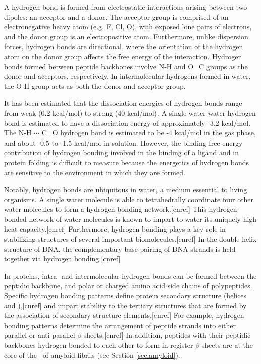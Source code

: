 A hydrogen bond is formed from electrostatic interactions arising between two dipoles: an acceptor and a donor.   The acceptor group is comprised of an electronegative heavy atom (e.g. F, Cl, O), with exposed lone pairs of electrons, and the donor group is an electropositive atom.  Furthermore, unlike dispersion forces, hydrogen bonds are directional, where the orientation of the hydrogen atom on the donor group affects the free energy of the interaction. Hydrogen bonds formed between peptide backbones involve N-H and O=C groups as the donor and acceptors, respectively.  In intermolecular hydrogens formed in water, the O-H group acts as both the donor and acceptor group.

It has been estimated that the dissociation energies of hydrogen bonds range from weak (0.2 kcal/mol) to strong (40 kcal/mol).\cite{Steiner:2002tb} A single water-water hydrogen bond is estimated to have a dissociation energy of approximately -3.2 kcal/mol.\cite{Steiner:2002tb}  The N-H $\cdots$ C=O hydrogen bond is estimated to be -4 kcal/mol in the gas phase,\cite{Klotz:1993fk} and about -0.5 to -1.5 kcal/mol in solution.\cite{Williams:1993wk} %
However, the binding free energy contribution of hydrogen bonding involved in the binding of a ligand and in protein folding is difficult to measure because the energetics of hydrogen bonds are sensitive to the environment in which they are formed.\cite{Klotz:1993fk}

Notably, hydrogen bonds are ubiquitous in water, a medium essential to living organisms. A single water molecule is able to tetrahedrally coordinate four other water molecules to form a hydrogen bonding network.[cnref] This hydrogen-bonded network of water molecules is known to impart to water its uniquely high heat capacity.[cnref]  Furthermore, hydrogen bonding plays a key role in stabilizing structures of several important biomolecules.[cnref]  In the double-helix structure of DNA,  the complementary base pairing of DNA strands is held together via hydrogen bonding.[cnref]

In proteins, intra- and intermolecular hydrogen bonds can be formed between the peptidic backbone, and polar or charged amino acid side chains of polypeptides.  Specific  hydrogen bonding patterns define protein secondary structure (helices and \bsheets),[cnref] and impart stability to the tertiary structures that are formed by the association of secondary structure elements.[cnref] For example, hydrogen bonding patterns determine the arrangement of peptide strands into either parallel or anti-parallel $\beta$-sheets.[cnref] In addition, peptides with their peptidic backbones hydrogen-bonded to each other to form in-register $\beta$-sheets are at the core of the \crossbs\ of amyloid fibrils (see Section \ref{sec:amyloid}). 

